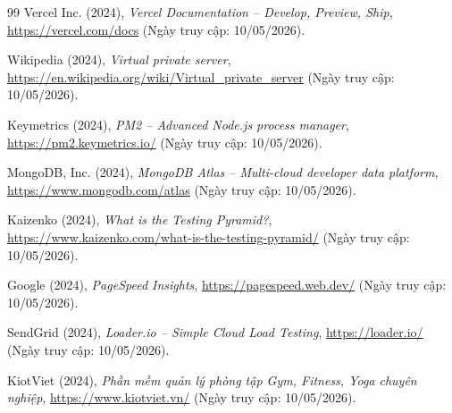 \begin{thebibliography}{99}
Vercel Inc. (2024), \textit{Vercel Documentation -- Develop, Preview, Ship}, \url{https://vercel.com/docs} (Ngày truy cập: 10/05/2026).

Wikipedia (2024), \textit{Virtual private server}, \url{https://en.wikipedia.org/wiki/Virtual_private_server} (Ngày truy cập: 10/05/2026).

Keymetrics (2024), \textit{PM2 -- Advanced Node.js process manager}, \url{https://pm2.keymetrics.io/} (Ngày truy cập: 10/05/2026).

MongoDB, Inc. (2024), \textit{MongoDB Atlas -- Multi-cloud developer data platform}, \url{https://www.mongodb.com/atlas} (Ngày truy cập: 10/05/2026).

Kaizenko (2024), \textit{What is the Testing Pyramid?}, \url{https://www.kaizenko.com/what-is-the-testing-pyramid/} (Ngày truy cập: 10/05/2026).

Google (2024), \textit{PageSpeed Insights}, \url{https://pagespeed.web.dev/} (Ngày truy cập: 10/05/2026).

SendGrid (2024), \textit{Loader.io -- Simple Cloud Load Testing}, \url{https://loader.io/} (Ngày truy cập: 10/05/2026).

KiotViet (2024), \textit{Phần mềm quản lý phòng tập Gym, Fitness, Yoga chuyên nghiệp}, \url{https://www.kiotviet.vn/} (Ngày truy cập: 10/05/2026).

\end{thebibliography}
